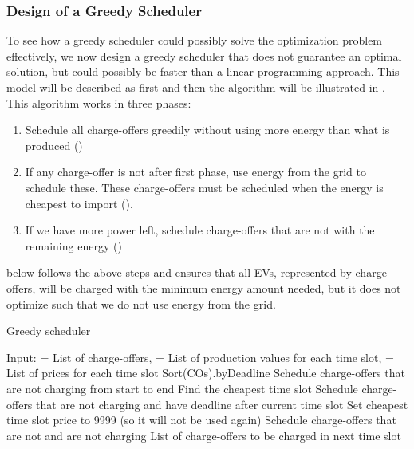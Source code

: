 \subsubsection{Design of a Greedy Scheduler}
To see how a greedy scheduler could possibly solve the optimization problem effectively, we now design a greedy scheduler that does not guarantee an optimal solution, but could possibly be faster than a linear programming approach. This model will be described as  first and then the algorithm will be illustrated in . This algorithm works in three phases:

\begin{enumerate}
    \item Schedule all charge-offers greedily without using more energy than what is produced ()
    \item If any charge-offer is not  after first phase, use energy from the grid to schedule these. These charge-offers must be scheduled when the energy is cheapest to import ().
    \item If we have more power left, schedule charge-offers that are not  with the remaining energy ()
\end{enumerate}

 below follows the above steps and ensures that all EVs, represented by charge-offers, will be charged with the minimum energy amount needed, but it does not optimize such that we do not use energy from the grid. 

\begin{algorithm}[!htb]
\small
\caption{Greedy scheduler}\label{alg:greedy}
	\begin{algorithmic}[1]
		\State Input:  = List of charge-offers,  = List of production values for each time slot,  = List of prices for each time slot
		\State Sort(COs).byDeadline
		   
			\State Schedule charge-offers that are not charging from start to end
		  \EndWhile
		    
			\State Find the cheapest time slot
			\State Schedule charge-offers that are not charging and have deadline after current time slot
		    \State Set cheapest time slot price to \num{9999} (so it will not be used again)
		  \EndWhile
		   
			\State Schedule charge-offers that are not  and are not charging
		  \EndWhile 
		\EndFor
		\State \Return List of charge-offers to be charged in next time slot
	\end{algorithmic}
\end{algorithm}

